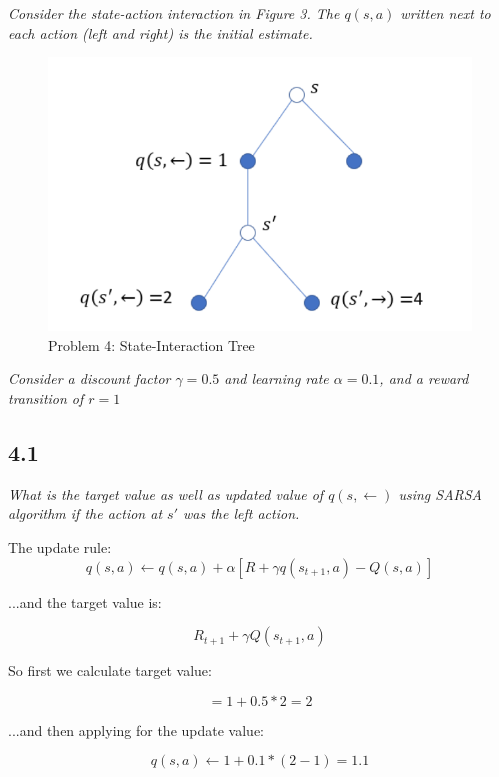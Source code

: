 \documentclass{article}
\begin{document}
\textit{Consider the state-action interaction in Figure 3. The $q(s,a)$ written next to each action (left and right) is the initial estimate.}

\begin{figure}
    \centering
    \includegraphics[width=.8\linewidth]{imgs/midterm.4.1.png}
    \caption{Problem 4: State-Interaction Tree}
\end{figure}

\textit{Consider a discount factor $\gamma = 0.5$ and learning rate $\alpha=0.1$, and a reward transition of $r=1$}

\subsection*{4.1}
\textit{What is the target value as well as updated value of $q(s,\leftarrow)$ using SARSA algorithm if the action at $s'$ was the left action.}

The update rule:
\begin{equation}
    q(s,a) \leftarrow q(s,a) + \alpha [R + \gamma q(s_{t+1},a) - Q(s,a)]
\end{equation}

...and the target value is:

\begin{equation}
    R_{t+1} + \gamma Q(s_{t+1}, a)
\end{equation}

So first we calculate target value:

\begin{equation}
    = 1 + 0.5 * 2 = 2
\end{equation}

...and then applying for the update value:

\begin{equation}
    q(s,a) \leftarrow 1 + 0.1 * (2 - 1) = 1.1
\end{equation}
\end{document}
